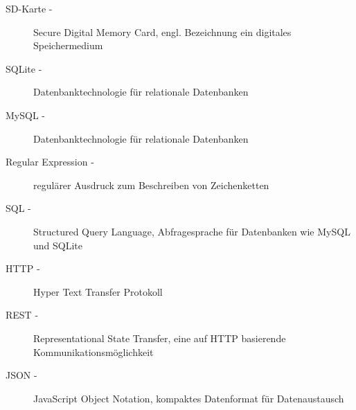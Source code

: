 \begin{description}
                \item[SD-Karte -] Secure Digital Memory Card, engl. Bezeichnung ein digitales Speichermedium
                \item[SQLite -] Datenbanktechnologie für relationale Datenbanken
                \item[MySQL -] Datenbanktechnologie für relationale Datenbanken
                \item[Regular Expression -] regulärer Ausdruck zum Beschreiben von Zeichenketten
                \item[SQL -] Structured Query Language, Abfragesprache für Datenbanken wie MySQL und SQLite
                \item[HTTP -] Hyper Text Transfer Protokoll
                \item[REST -] Representational State Transfer, eine auf HTTP basierende Kommunikationsmöglichkeit
                \item[JSON -] JavaScript Object Notation, kompaktes Datenformat für Datenaustausch
			\end{description}